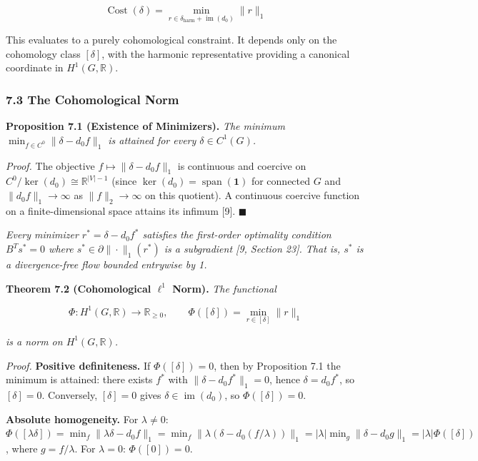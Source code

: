 \documentclass[
]{article}
\begin{document}
\[ \operatorname{Cost}(\delta) = \min_{r \in \delta_{\text{harm}} + \operatorname{im}(d_0)} \|r\|_1 \]

This evaluates to a purely cohomological constraint. It depends only on
the cohomology class \([\delta]\), with the harmonic representative
providing a canonical coordinate in \(H^1(G, \mathbb{R})\).

\subsubsection{7.3 The Cohomological Norm}\label{the-cohomological-norm}

\textbf{Proposition 7.1 (Existence of Minimizers).} \emph{The minimum
\(\min_{f \in C^0} \|\delta - d_0 f\|_1\) is attained for every
\(\delta \in C^1(G)\).}

\emph{Proof.} The objective \(f \mapsto \|\delta - d_0 f\|_1\) is
continuous and coercive on \(C^0 / \ker(d_0) \cong \mathbb{R}^{|V|-1}\)
(since \(\ker(d_0) = \operatorname{span}(\mathbf{1})\) for connected
\(G\) and \(\|d_0 f\|_1 \to \infty\) as \(\|f\|_2 \to \infty\) on this
quotient). A continuous coercive function on a finite-dimensional space
attains its infimum {[}9{]}. \(\blacksquare\)

\emph{Every minimizer \(r^* = \delta - d_0 f^*\) satisfies the
first-order optimality condition \(B^T s^* = 0\) where
\(s^* \in \partial\|\cdot\|_1(r^*)\) is a subgradient {[}9, Section
23{]}. That is, \(s^*\) is a divergence-free flow bounded entrywise by
1.}

\textbf{Theorem 7.2 (Cohomological \(\ell^1\) Norm).} \emph{The
functional}

\[ \Phi : H^1(G, \mathbb{R}) \to \mathbb{R}_{\geq 0}, \qquad \Phi([\delta]) = \min_{r \in [\delta]} \|r\|_1 \]

\emph{is a norm on \(H^1(G, \mathbb{R})\).}

\emph{Proof.} \textbf{Positive definiteness.} If \(\Phi([\delta]) = 0\),
then by Proposition 7.1 the minimum is attained: there exists \(f^*\)
with \(\|\delta - d_0 f^*\|_1 = 0\), hence \(\delta = d_0 f^*\), so
\([\delta] = 0\). Conversely, \([\delta] = 0\) gives
\(\delta \in \operatorname{im}(d_0)\), so \(\Phi([\delta]) = 0\).

\textbf{Absolute homogeneity.} For \(\lambda \neq 0\):
\(\Phi([\lambda \delta]) = \min_f \|\lambda \delta - d_0 f\|_1 = \min_f \|\lambda(\delta - d_0(f/\lambda))\|_1 = |\lambda| \min_g \|\delta - d_0 g\|_1 = |\lambda| \Phi([\delta])\),
where \(g = f/\lambda\). For \(\lambda = 0\): \(\Phi([0]) = 0\).
\end{document}
